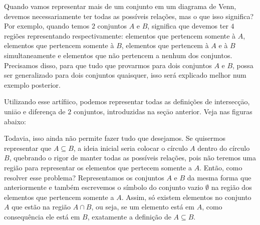   
  
  Quando vamos representar mais de um conjunto em um diagrama de Venn, devemos necessariamente ter todas as possíveis relações, mas o que isso significa? Por exemplo, quando temos $2$ conjuntos $A$ e $B$, significa que devemos ter $4$ regiões representando respectivamente: elementos que pertencem somente à $A$, elementos que pertencem somente à $B$, elementos que pertencem à $A$ e à $B$ simultaneamente e elementos que não pertencem a nenhum dos conjuntos. Precisamos disso, para que tudo que provarmos para dois conjuntos $A$ e $B$, possa ser generalizado para dois conjuntos quaisquer, isso será explicado melhor num exemplo posterior.
  
  Utilizando esse artífiico, podemos representar todas as definições de intersecçāo, uniāo e diferença de $2$ conjuntos, introduzidas na seçāo anterior. Veja nas figuras abaixo:
  
  
  
  
  Todavia, isso ainda não permite fazer tudo que desejamos. Se quisermos representar que $A \subseteq B$, a ideia inicial seria colocar o círculo $A$ dentro do círculo $B$, quebrando o rigor de manter todas as possíveis relações, pois não teremos uma região para representar os elementos que pertecem somente a $A$. Então, como resolver esse problema? Representamos os conjuntos $A$ e $B$ da mesma forma que anteriormente e também escrevemos o símbolo do conjunto vazio $\emptyset$ na região dos elementos que pertencem somente a $A$. Assim, só existem elementos no conjunto $A$ que estão na região $A\cap B$, ou seja, se um elemento está em $A$, como consequência ele está em $B$, exatamente a definição de $A \subseteq B$.
  
